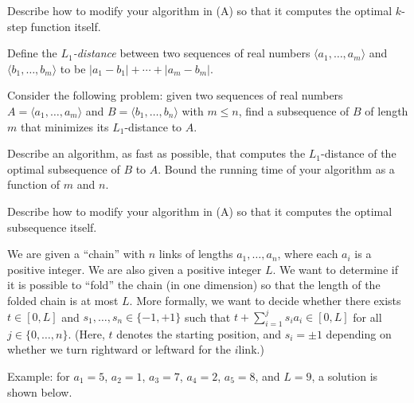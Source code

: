 \begin{questions}[start=16]
{\begin{questions}
           
           \item {} Describe how to modify your algorithm in
           (A) so that it computes the optimal $k$-step function
           itself.
           
       \end{questions}
    }
    
    
    \item {}%
    { Define the \emph{$L_1$-distance} between two sequences of real
       numbers $\langle a_1,\ldots,a_m\rangle$ and
       $\langle b_1,\ldots,b_m\rangle$ to be
       $|a_1-b_1|+\cdots+|a_m-b_m|$.
       
       Consider the following problem: given two sequences of real
       numbers $A=\langle a_1,\ldots,a_m\rangle$ and
       $B=\langle b_1,\ldots,b_n\rangle$ with $m\le n$, find a
       subsequence of $B$ of length $m$ that minimizes its
       $L_1$-distance to $A$.
       
       \begin{questions}
           \item {} Describe an algorithm, as fast as
           possible, that computes the $L_1$-distance of the optimal
           subsequence of $B$ to $A$. Bound the running time of your
           algorithm as a function of $m$ and $n$.
           
           \item {} Describe how to modify your algorithm in
           (A) so that it computes the optimal subsequence itself.
       \end{questions}
    }
    
    
    \newpage
    \item {}%
    { We are given a ``chain'' with $n$ links of lengths
       $a_1,\ldots, a_n$, where each $a_i$ is a positive integer.  We
       are also given a positive integer $L$.  We want to determine if
       it is possible to ``fold'' the chain (in one dimension) so that
       the length of the folded chain is at most $L$.  More formally,
       we want to decide whether there exists $t\in [0,L]$ and
       $s_1,\ldots,s_n\in\{-1,+1\}$ such that
       $t + \sum_{i=1}^j s_i a_i\in [0,L]$ for all
       $j\in\{0,\ldots, n\}$.  (Here, $t$ denotes the starting
       position, and $s_i=\pm 1$ depending on whether we turn
       rightward or leftward for the $i$\th link.)
       
       Example: for $a_1=5$, $a_2=1$, $a_3=7$, $a_4=2$, $a_5=8$, and
       $L=9$, a solution is shown below.
       
}
\end{questions}
